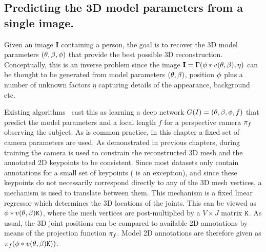 \subsection{Predicting the 3D model parameters from a single image.}

Given an image $\mathbf{I}$ containing a person, the goal is to recover the 3D model parameters $(\theta,\beta,\phi)$ that provide the best possible 3D reconstruction. 
Conceptually, this is an inverse problem since the image $\mathbf{I} = \Gamma(\phi * v(\theta,\beta), \eta)$ can be thought to be generated from model parameters $(\theta,\beta)$, position $\phi$ plus a number of unknown factors $\eta$ capturing details of the appearance, background etc.

Existing algorithms~\cite{kanazawa18learning} cast this as learning a deep network $G(I) = (\theta, \beta, \phi, f)$ that predict the model parameters and a focal length $f$ for a perspective camera $\pi_{f}$ observing the subject. As is common practice, in this chapter a fixed set of camera parameters are used.
As demonstrated in previous chapters, during training the camera is used to constrain the reconstructed 3D mesh and the annotated 2D keypoints to be consistent.
Since most datasets only contain annotations for a small set of keypoints (\cite{guler2018densepose} is an exception), and since these keypoints do not necessarily correspond directly to any of the 3D mesh vertices, a mechanism is used to translate between them. 
This mechanism is a fixed linear regressor which determines the 3D locations of the joints. This can be viewed as $\phi * v(\theta,\beta)\mathtt{K})$, where the mesh vertices are post-multiplied by a $V \times J$ matrix $\mathtt{K}$.
As usual, the 3D joint positions can be compared to available 2D annotations by means of the projection function $\pi_{f}$. Model 2D annotations are therefore given as $\pi_{f}(\phi * v(\theta,\beta)\mathtt{K}))$.

